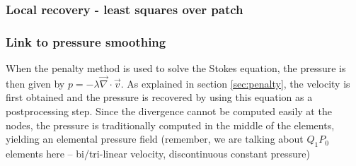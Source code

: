\subsubsection{Local recovery - least squares over patch}



\subsubsection{Link to pressure smoothing}

When the penalty method is used to solve the Stokes equation, the pressure
is then given by $p=-\lambda \vec\nabla \cdot \vec v$. As explained in 
section \ref{sec:penalty}, the velocity is first obtained and the pressure 
is recovered by using this equation as a postprocessing step. Since the divergence 
cannot be computed easily at the nodes, the pressure is traditionally computed 
in the middle of the elements, yielding an elemental pressure field (remember, 
we are talking about $Q_1P_0$ elements here -- bi/tri-linear velocity, discontinuous
constant pressure)


